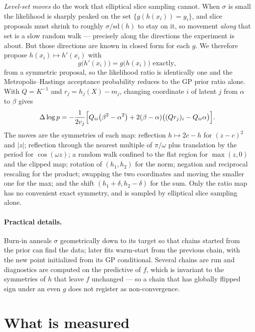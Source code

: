 \documentclass[11pt]{article}
\begin{document}
\emph{Level-set moves} do the work that elliptical slice sampling cannot. When
$\sigma$ is small the likelihood is sharply peaked on the set
$\{g(h(x_i))=y_i\}$, and slice proposals must shrink to roughly
$\sigma/\mathrm{sd}(h)$ to stay on it, so movement \emph{along} that set is a slow
random walk --- precisely along the directions the experiment is about. But
those directions are known in closed form for each $g$. We therefore propose
$h(x_i)\mapsto h'(x_i)$ with
\begin{equation}
g\bigl(h'(x_i)\bigr)=g\bigl(h(x_i)\bigr) \text{ exactly},
\end{equation}
from a symmetric proposal, so the likelihood ratio is identically one and the
Metropolis--Hastings acceptance probability reduces to the GP prior ratio alone.
With $Q=K^{-1}$ and $r_j=h_j(X)-m_j$, changing coordinate $i$ of latent $j$ from
$\alpha$ to $\beta$ gives
\begin{equation}
\Delta\log p=-\frac{1}{2v_j}\Bigl[Q_{ii}\bigl(\beta^2-\alpha^2\bigr)
+2(\beta-\alpha)\bigl((Qr_j)_i-Q_{ii}\alpha\bigr)\Bigr].
\end{equation}
The moves are the symmetries of each map: reflection $h\mapsto 2c-h$ for
$(z-c)^2$ and $|z|$; reflection through the nearest multiple of $\pi/\omega$ plus
translation by the period for $\cos(\omega z)$; a random walk confined to the
flat region for $\max(z,0)$ and the clipped map; rotation of $(h_1,h_2)$ for the
norm; negation and reciprocal rescaling for the product; swapping the two
coordinates and moving the smaller one for the max; and the shift
$(h_1+\delta,h_2-\delta)$ for the sum. Only the ratio map has no convenient
exact symmetry, and is sampled by elliptical slice sampling alone.

\paragraph{Practical details.} Burn-in anneals $\sigma$ geometrically down to its
target so that chains started from the prior can find the data; later fits
warm-start from the previous chain, with the new point initialized from its GP
conditional. Several chains are run and diagnostics are computed on the
predictive of $f$, which is invariant to the symmetries of $h$ that leave $f$
unchanged --- so a chain that has globally flipped sign under an even $g$ does
not register as non-convergence.

\section{What is measured}
\end{document}
